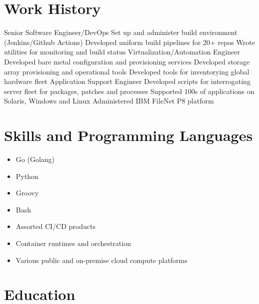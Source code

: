 \documentclass{res}
\begin{document}
\section{Work History}
Senior Software Engineer/DevOps
\workitems
{Set up and administer build environment (Jenkins/Github Actions)}
{Developed uniform build pipelines for 20+ repos}
{Wrote utilities for monitoring and build status}
Virtualization/Automation Engineer
\workitems
{Developed bare metal configuration and provisioning services}
{Developed storage array provisioning and operational tools}
{Developed tools for inventorying global hardware fleet}
Application Support Engineer
\workitems
{Developed scripts for interrogating server fleet for packages, patches and processes}
{Supported 100s of applications on Solaris, Windows and Linux}
{Administered IBM FileNet P8 platform}
\section{Skills and Programming Languages}
\begin{itemize}
\setlength\itemsep{-0.5em}
\item\normalsize Go (Golang)
\item Python
\item Groovy
\item Bash
\item Assorted CI/CD products
\item Container runtimes and orchestration
\item Various public and on-premise cloud compute platforms
\end{itemize}
\section{Education}
\end{document}
